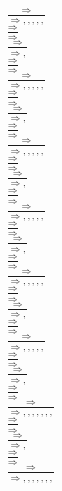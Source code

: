 \documentclass[11pt]{article}
\begin{document}
\begin{center}
\\$\frac{\Rightarrow }{\Rightarrow , , , , , }$
\bigskip
\\$\frac{\Rightarrow }{\Rightarrow }$
\bigskip
\\$\frac{\Rightarrow }{\Rightarrow , }$
\bigskip
\\$\frac{\Rightarrow }{\Rightarrow }$
\bigskip
\\$\frac{\Rightarrow }{\Rightarrow , , , , , }$
\bigskip
\\$\frac{\Rightarrow }{\Rightarrow }$
\bigskip
\\$\frac{\Rightarrow }{\Rightarrow , }$
\bigskip
\\$\frac{\Rightarrow }{\Rightarrow }$
\bigskip
\\$\frac{\Rightarrow }{\Rightarrow , , , , , }$
\bigskip
\\$\frac{\Rightarrow }{\Rightarrow }$
\bigskip
\\$\frac{\Rightarrow }{\Rightarrow , }$
\bigskip
\\$\frac{\Rightarrow }{\Rightarrow }$
\bigskip
\\$\frac{\Rightarrow }{\Rightarrow , , , , , }$
\bigskip
\\$\frac{\Rightarrow }{\Rightarrow }$
\bigskip
\\$\frac{\Rightarrow }{\Rightarrow , }$
\bigskip
\\$\frac{\Rightarrow }{\Rightarrow }$
\bigskip
\\$\frac{\Rightarrow }{\Rightarrow , , , , , }$
\bigskip
\\$\frac{\Rightarrow }{\Rightarrow }$
\bigskip
\\$\frac{\Rightarrow }{\Rightarrow , }$
\bigskip
\\$\frac{\Rightarrow }{\Rightarrow }$
\bigskip
\\$\frac{\Rightarrow }{\Rightarrow , , , , , }$
\bigskip
\\$\frac{\Rightarrow }{\Rightarrow }$
\bigskip
\\$\frac{\Rightarrow }{\Rightarrow , }$
\bigskip
\\$\frac{\Rightarrow }{\Rightarrow }$
\bigskip
\\$\frac{\Rightarrow }{\Rightarrow , , , , , , , }$
\bigskip
\\$\frac{\Rightarrow }{\Rightarrow }$
\bigskip
\\$\frac{\Rightarrow }{\Rightarrow , }$
\bigskip
\\$\frac{\Rightarrow }{\Rightarrow }$
\bigskip
\\$\frac{\Rightarrow }{\Rightarrow , , , , , , , }$

\end{center}
\end{document}
